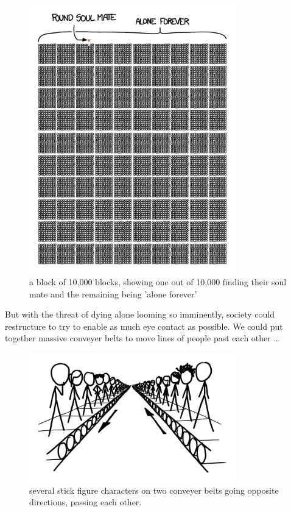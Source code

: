 \begin{figure}[!htbp]
\centering
\includegraphics[scale=0.5, max width=0.8\textwidth]{imgs/a/9/soulmates_10000.png}
\caption{a block of 10,000 blocks, showing one out of 10,000 finding their soul mate and the remaining being 'alone forever'}
\end{figure}

{But with the threat of dying alone looming so imminently, society could restructure to try to enable as much eye contact as possible. We could put together massive conveyer belts to move lines of people past each other …}

\begin{figure}[!htbp]
\centering
\includegraphics[scale=0.5, max width=0.8\textwidth]{imgs/a/9/soulmates_conveyor.png}
\caption{several stick figure characters on two conveyer belts going opposite directions, passing each other.}
\end{figure}

